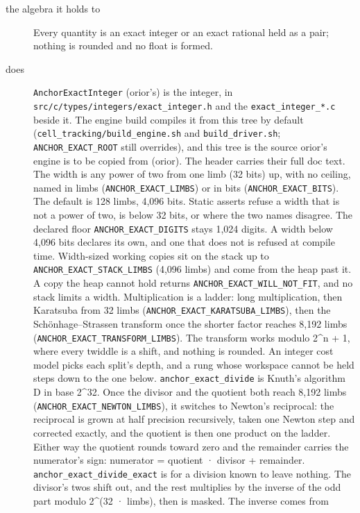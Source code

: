 \begin{description}
\item[{the algebra it holds to}] Every quantity is an exact integer or an exact rational held as a pair; nothing is rounded and no float is formed.
\item[{does}] \texttt{Anchor\allowbreak{}Exact\allowbreak{}Integer} (orior's) is the integer, in \texttt{src/\allowbreak{}c/\allowbreak{}types/\allowbreak{}integers/\allowbreak{}exact\_\allowbreak{}integer.\allowbreak{}h} and the \texttt{exact\_\allowbreak{}integer\_\allowbreak{}*.\allowbreak{}c} beside it. The engine build compiles it from this tree by default (\texttt{cell\_\allowbreak{}tracking/\allowbreak{}build\_\allowbreak{}engine.\allowbreak{}sh} and \texttt{build\_\allowbreak{}driver.\allowbreak{}sh}; \texttt{ANCHOR\_\allowbreak{}EXACT\_\allowbreak{}ROOT} still overrides), and this tree is the source orior's engine is to be copied from (orior). The header carries their full doc text. The width is any power of two from one limb (32 bits) up, with no ceiling, named in limbs (\texttt{ANCHOR\_\allowbreak{}EXACT\_\allowbreak{}LIMBS}) or in bits (\texttt{ANCHOR\_\allowbreak{}EXACT\_\allowbreak{}BITS}). The default is 128 limbs, 4,096 bits. Static asserts refuse a width that is not a power of two, is below 32 bits, or where the two names disagree. The declared floor \texttt{ANCHOR\_\allowbreak{}EXACT\_\allowbreak{}DIGITS} stays 1,024 digits. A width below 4,096 bits declares its own, and one that does not is refused at compile time. Width-sized working copies sit on the stack up to \texttt{ANCHOR\_\allowbreak{}EXACT\_\allowbreak{}STACK\_\allowbreak{}LIMBS} (4,096 limbs) and come from the heap past it. A copy the heap cannot hold returns \texttt{ANCHOR\_\allowbreak{}EXACT\_\allowbreak{}WILL\_\allowbreak{}NOT\_\allowbreak{}FIT}, and no stack limits a width. Multiplication is a ladder: long multiplication, then Karatsuba from 32 limbs (\texttt{ANCHOR\_\allowbreak{}EXACT\_\allowbreak{}KARATSUBA\_\allowbreak{}LIMBS}), then the Schönhage–Strassen transform once the shorter factor reaches 8,192 limbs (\texttt{ANCHOR\_\allowbreak{}EXACT\_\allowbreak{}TRANSFORM\_\allowbreak{}LIMBS}). The transform works modulo 2\textasciicircum{}n + 1, where every twiddle is a shift, and nothing is rounded. An integer cost model picks each split's depth, and a rung whose workspace cannot be held steps down to the one below. \texttt{anchor\_\allowbreak{}exact\_\allowbreak{}divide} is Knuth's algorithm D in base 2\textasciicircum{}32. Once the divisor and the quotient both reach 8,192 limbs (\texttt{ANCHOR\_\allowbreak{}EXACT\_\allowbreak{}NEWTON\_\allowbreak{}LIMBS}), it switches to Newton's reciprocal: the reciprocal is grown at half precision recursively, taken one Newton step and corrected exactly, and the quotient is then one product on the ladder. Either way the quotient rounds toward zero and the remainder carries the numerator's sign: numerator = quotient · divisor + remainder. \texttt{anchor\_\allowbreak{}exact\_\allowbreak{}divide\_\allowbreak{}exact} is for a division known to leave nothing. The divisor's twos shift out, and the rest multiplies by the inverse of the odd part modulo 2\textasciicircum{}(32 · limbs), then is masked. The inverse comes from 
\end{description}
